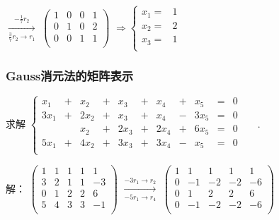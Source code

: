 \begin{frame}
{{$\xrightarrow[\frac37r_2\rightarrow r_1]{-\frac17r_2}$
$\left(\begin{array}{rrrr}1&0&0&1\\0&1&0&2\\0&0&1&1\\\end{array}\right)$ \pp
$\Rightarrow \left\{\begin{array}{rr}
x_1 =&   1\\
x_2 =& 2 \\
x_3 =&   1\\
\end{array}\right.$}}
\end{frame}




\begin{frame}\frametitle{Gauss消元法的矩阵表示}
\begin{example}[齐次线性方程组]
求解 $\left\{\begin{array}{rrrrrrrrrrrrrr}
x_1 & + & x_2 & + & x_3 & + & x_4 & + & x_5 & = & 0 && \\
3x_1 & + &2x_2 & + & x_3 & + & x_4 & - &3x_5 & = & 0 && \\
&   & x_2 & + &2x_3 & + &2x_4 & + &6x_5 & = & 0 && \\
5x_1 & + &4x_2 & + &3x_3 & + &3x_4 & - & x_5 & = & 0 && \\
\end{array}\right.$.
\end{example}
\pp
\bigskip

解：
$\left(\begin{array}{rrrrr}1&1&1&1&1\\3&2&1&1&-3\\0&1&2&2&6\\5&4&3&3&-1\\\end{array}\right)$	\pp
$\xrightarrow[-5r_1\rightarrow r_4]{-3r_1\rightarrow r_2}$
$\left(\begin{array}{rrrrr}1&1&1&1&1\\0&-1&-2&-2&-6\\0&1&2&2&6\\0&-1&-2&-2&-6\\\end{array}\right)$
\pp
\bigskip


\end{frame}
